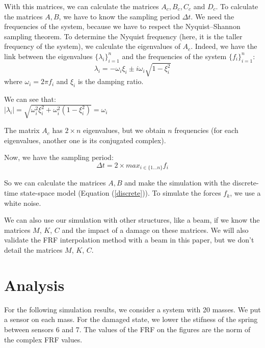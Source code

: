 \documentclass[journal]{IEEEtran}
\begin{document}
With this matrices, we can calculate the matrices $A_c, B_c, C_c$ and $D_c$. To calculate the matrices $A, B$, we have to know the
sampling period $\Delta t$. We need the frequencies of the system, because we have to respect the Nyquist–Shannon sampling theorem.
To determine the Nyquist frequency (here, it is the taller frequency of the system), we calculate the eigenvalues of $A_c$. Indeed, we have the link between the eigenvalues $\{\lambda_i\}_{i=1}^n$ and the frequencies of the system $\{f_i\}_{i=1}^n$:
\begin{equation}
\lambda_i = - \omega_i \xi_i \pm i \omega_i \sqrt{1 - \xi_i^2}
\end{equation}
where $\omega_i = 2 \pi f_i$ and $\xi_i$ is the damping ratio.

\begin{remark}
We can see that:\\
$|\lambda_i| = \sqrt{\omega_i^2 \xi_i^2 + \omega_i^2 (1 - \xi_i^2)} = \omega_i$
\end{remark}

\begin{remark}
The matrix $A_c$ has $2 \times n$ eigenvalues, but we obtain $n$ frequencies (for each eigenvalues, another one is its conjugated complex).
\end{remark}

Now, we have the sampling period:
\begin{equation}
\Delta t = 2 \times max_{i \in \{1 ... n\} } f_i
\end{equation}

So we can calculate the matrices $A, B$ and make the simulation with the discrete-time state-space model (Equation (\ref{discrete})). To simulate the forces $f_k$, we use a white noise.


We can also use our simulation with other structures, like a beam, if we know the matrices $M$, $K$, $C$ and the impact of a damage on these matrices.
We will also validate the FRF interpolation method with a beam in this paper, but we don't detail the matrices $M$, $K$, $C$.


\section{Analysis}

For the following simulation results, we consider a system with 20 masses. We put a sensor on each mass. For the damaged state, we lower the stifness of the spring between sensors 6 and 7. The values of the FRF on the figures are the norm of the complex FRF values.
\end{document}
